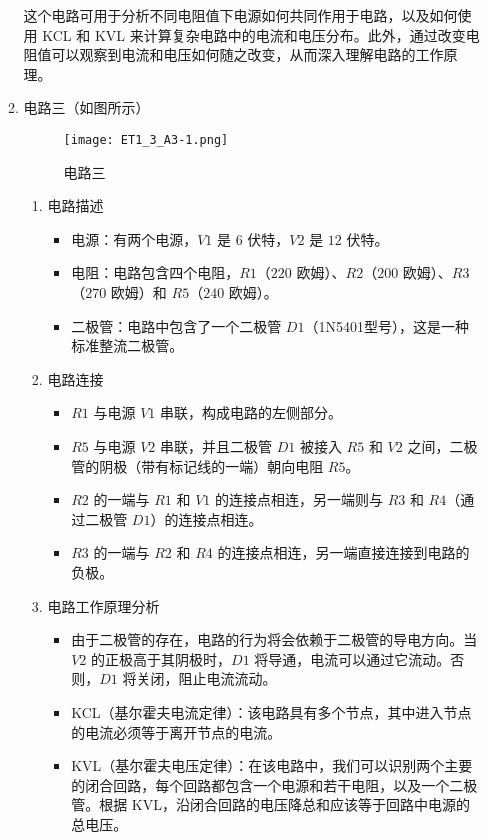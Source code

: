 \documentclass[dvipsnames, svgnames,a4paper,11pt]{article}
\begin{document}
\begin{enumerate}
\begin{enumerate}
			这个电路可用于分析不同电阻值下电源如何共同作用于电路，以及如何使用 KCL 和 KVL 来计算复杂电路中的电流和电压分布。此外，通过改变电阻值可以观察到电流和电压如何随之改变，从而深入理解电路的工作原理。
			
			\item 电路三（如图所示）
			
			\begin{figure}[htbp]
				\centering
				\texttt{[image: ET1\_3\_A3-1.png]}
				\caption{电路三}
				\label{fig:fig3-1}
			\end{figure}
			
			\begin{enumerate}
				\item 电路描述
				
				\begin{itemize}
					\item 电源：有两个电源，$V1$ 是 $6$ 伏特，$V2$ 是 $12$ 伏特。
					\item 电阻：电路包含四个电阻，$R1$（$220$ 欧姆）、$R2$（$200$ 欧姆）、$R3$（$270$ 欧姆）和 $R5$（$240$ 欧姆）。
					\item 二极管：电路中包含了一个二极管 $D1$（1N5401型号），这是一种标准整流二极管。
				\end{itemize}
				
				\item 电路连接
				
				\begin{itemize}
					\item $R1$ 与电源 $V1$ 串联，构成电路的左侧部分。
					\item $R5$ 与电源 $V2$ 串联，并且二极管 $D1$ 被接入 $R5$ 和 $V2$ 之间，二极管的阴极（带有标记线的一端）朝向电阻 $R5$。
					\item $R2$ 的一端与 $R1$ 和 $V1$ 的连接点相连，另一端则与 $R3$ 和 $R4$（通过二极管 $D1$）的连接点相连。
					\item $R3$ 的一端与 $R2$ 和 $R4$ 的连接点相连，另一端直接连接到电路的负极。
				\end{itemize}
				
				\item 电路工作原理分析
				
				\begin{itemize}
					\item 由于二极管的存在，电路的行为将会依赖于二极管的导电方向。当 $V2$ 的正极高于其阴极时，$D1$ 将导通，电流可以通过它流动。否则，$D1$ 将关闭，阻止电流流动。
					\item KCL（基尔霍夫电流定律）：该电路具有多个节点，其中进入节点的电流必须等于离开节点的电流。
					\item KVL（基尔霍夫电压定律）：在该电路中，我们可以识别两个主要的闭合回路，每个回路都包含一个电源和若干电阻，以及一个二极管。根据 KVL，沿闭合回路的电压降总和应该等于回路中电源的总电压。
				\end{itemize}
				

\end{enumerate}
\end{enumerate}
\end{enumerate}
\end{document}
